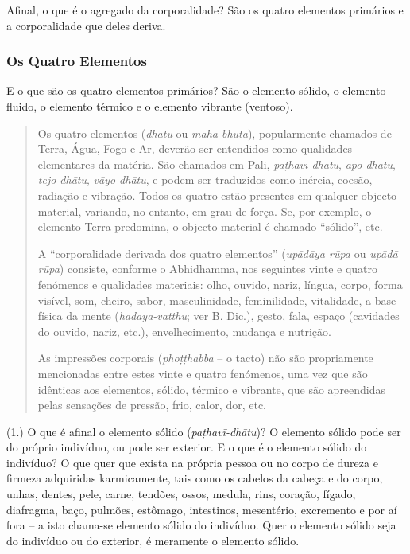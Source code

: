 
Afinal, o que é o agregado da corporalidade? São os quatro elementos primários e
a corporalidade que deles deriva.

\subsubsection{Os Quatro Elementos}

E o que são os quatro elementos primários? São o elemento sólido, o elemento
fluido, o elemento térmico e o elemento vibrante (ventoso).


\begin{quote}
  Os quatro elementos (\emph{dhātu} ou \emph{mahā-bhūta}), popularmente chamados
  de Terra, Água, Fogo e Ar, deverão ser entendidos como qualidades elementares
  da matéria. São chamados em Pāli, \emph{pa\d{t}havī-dhātu}, \emph{āpo-dhātu},
  \emph{tejo-dhātu}, \emph{vāyo-dhātu}, e podem ser traduzidos como inércia,
  coesão, radiação e vibração. Todos os quatro estão presentes em qualquer
  objecto material, variando, no entanto, em grau de força. Se, por exemplo, o
  elemento Terra predomina, o objecto material é chamado ``sólido'', etc.

  A ``corporalidade derivada dos quatro elementos'' (\emph{upādāya rūpa} ou
  \emph{upādā rūpa}) consiste, conforme o Abhidhamma, nos seguintes vinte e
  quatro fenómenos e qualidades materiais: olho, ouvido, nariz, língua, corpo,
  forma visível, som, cheiro, sabor, masculinidade, feminilidade, vitalidade, a
  base física da mente (\emph{hadaya-vatthu}; ver B. Dic.), gesto, fala, espaço
  (cavidades do ouvido, nariz, etc.), envelhecimento, mudança e nutrição.

  As impressões corporais (\emph{pho\d{t}\d{t}habba} -- o tacto) não são propriamente
  mencionadas entre estes vinte e quatro fenómenos, uma vez que são idênticas
  aos elementos, sólido, térmico e vibrante, que são apreendidas pelas sensações
  de pressão, frio, calor, dor, etc.
\end{quote}

\bigskip

(1.) O que é afinal o elemento sólido (\emph{paṭhavī-dhātu})? O elemento sólido
pode ser do próprio indivíduo, ou pode ser exterior. E o que é o elemento sólido
do indivíduo? O que quer que exista na própria pessoa ou no corpo de dureza e
firmeza adquiridas karmicamente, tais como os cabelos da cabeça e do corpo,
unhas, dentes, pele, carne, tendões, ossos, medula, rins, coração, fígado,
diafragma, baço, pulmões, estômago, intestinos, mesentério, excremento e por aí
fora -- a isto chama-se elemento sólido do indivíduo. Quer o elemento sólido
seja do indivíduo ou do exterior, é meramente o elemento sólido.

